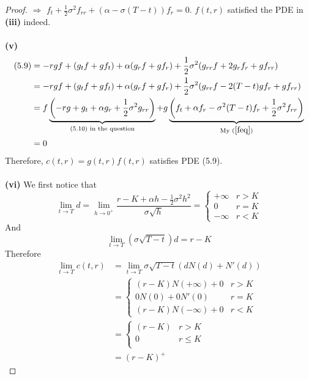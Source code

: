 \documentclass[a4paper, 10pt]{article}
\theoremstyle{definition}
\theoremstyle{hSol}
\begin{document}
\begin{proof}
$\Rightarrow$ $f_t + \frac{1}{2}\sigma^2 f_{rr} + (\alpha - \sigma(T-t))f_{r} = 0$. $f(t,r)$ satisfied the PDE in \textbf{(iii)} indeed.\\
~\\
\textbf{(v)} 
\begin{equation}
  \begin{split}
    (5.9) &= -rgf + (g_tf + gf_t) + \alpha(g_r f + gf_r) + \frac{1}{2}\sigma^2(g_{rr}f + 2g_r f_r + gf_{rr})\\
    &= -rgf + (g_tf + gf_t) + \alpha(g_r f + gf_r) + \frac{1}{2}\sigma^2(g_{rr}f- 2(T-t)g f_r + gf_{rr})\\
  &= f \underbrace{\left( -rg + g_t + \alpha g_r + \frac{1}{2}\sigma^2 g_{rr}\right)}_{(5.10)\text{ in the question}} + g\underbrace{\left(f_t + \alpha f_r - \sigma^2(T-t)f_r + \frac{1}{2}\sigma^2 f_{rr}\right)}_{\text{My }(\ref{feq})}\\
  &=0
  \end{split}
\end{equation}
Therefore, $c(t,r)=g(t,r)f(t,r)$ satisfies PDE (5.9).\\
~\\
\textbf{(vi)} We first notice that
\begin{equation}
  \lim\limits_{t\rightarrow T} d = \lim\limits_{h\rightarrow 0^+} \frac{r-K+\alpha h - \frac{1}{2}\sigma^2h^2}{\sigma \sqrt{h}} = \begin{cases}
  +\infty & r > K\\
  0 & r = K \\
  -\infty & r < K
  \end{cases}
\end{equation}
And
\begin{equation}
  \lim\limits_{t\rightarrow T} (\sigma \sqrt{T-t})d = r-K
\end{equation}
Therefore
\begin{equation}
  \begin{split}
  \lim\limits_{t \rightarrow T}c(t,r) &= \lim\limits_{t\rightarrow T}\sigma \sqrt{T-t} \left(dN(d) + N'(d)\right) \\
  &= 
  \begin{cases}
  (r-K)N(+\infty) + 0 & r > K\\
  0N(0) + 0N'(0) & r = K \\
  (r-K)N(-\infty) + 0 & r < K
  \end{cases}\\
  &=\begin{cases}
  (r-K) & r > K\\
  0 & r \leq K \\
  \end{cases}\\
  &=(r-K)^+
    \end{split}
\end{equation}


\end{proof}
\end{document}
